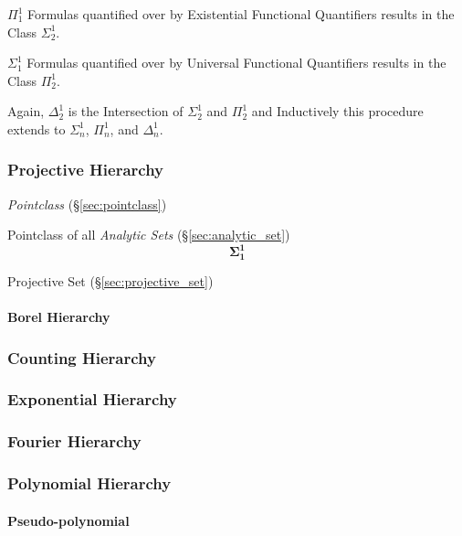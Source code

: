 $\Pi^1_1$ Formulas quantified over by Existential Functional
Quantifiers results in the Class $\Sigma^1_2$.

$\Sigma^1_1$ Formulas quantified over by Universal Functional
Quantifiers results in the Class $\Pi^1_2$.

Again, $\Delta^1_2$ is the Intersection of $\Sigma^1_2$ and $\Pi^1_2$
and Inductively this procedure extends to $\Sigma^1_n$, $\Pi^1_n$, and
$\Delta^1_n$.



\subsubsection{Projective Hierarchy}\label{sec:projective_hierarchy}

\emph{Pointclass} (\S\ref{sec:pointclass})

Pointclass of all \emph{Analytic Sets} (\S\ref{sec:analytic_set})
\[
  \mathbf{\Sigma^1_1}
\]

Projective Set (\S\ref{sec:projective_set})



\paragraph{Borel Hierarchy}\hfill



\subsubsection{Counting Hierarchy}

\subsubsection{Exponential Hierarchy}

\subsubsection{Fourier Hierarchy}

\subsubsection{Polynomial Hierarchy}

\paragraph{Pseudo-polynomial}\label{sec:pseudo_polynomial}\hfill

